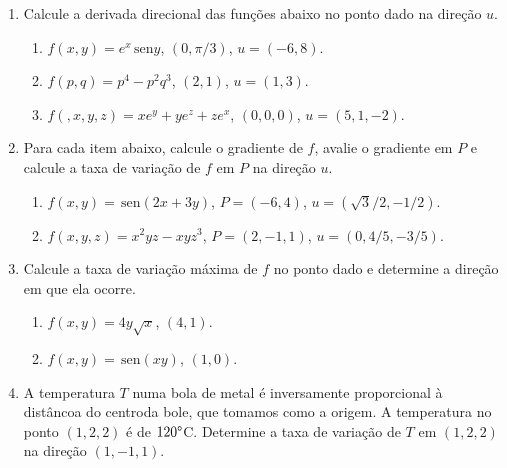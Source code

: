 \documentclass[a4paper,5pt]{amsbook}
\newcommand{\sen}{\,\mbox{sen}}
\begin{document}
\vspace{1cm}
\begin{enumerate}
    \setlength\itemsep{0.5cm}
    \item Calcule a derivada direcional das fun\c{c}\~oes abaixo no ponto dado na dire\c{c}\~ao $u$.
        \begin{enumerate}
            \setlength\itemsep{0.2cm}
            \item $f(x,y) = e^x\sen{y}$, $(0,\pi/3)$, $u=(-6,8)$.
            \item $f(p,q) = p^4-p^2q^3$, $(2,1)$, $u=(1,3)$.
            \item $f(,x,y,z) = xe^y+ye^z+ze^x$, $(0,0,0)$, $u=(5,1,-2)$.
        \end{enumerate}

    \item Para cada item abaixo, calcule o gradiente de $f$, avalie o gradiente
    em $P$ e calcule a taxa de varia\c{c}\~ao de $f$ em $P$ na dire\c{c}\~ao $u$.
        \begin{enumerate}
            \setlength\itemsep{0.2cm}
            \item $f(x,y) = \sen{(2x+3y)}$, $P=(-6,4)$, $u=(\sqrt{3}/2, -1/2)$.
            \item $f(x,y,z) = x^2yz-xyz^3$, $P=(2,-1,1)$, $u=(0,4/5, -3/5)$.
        \end{enumerate}

    \item Calcule a taxa de varia\c{c}\~ao m\'axima de $f$ no ponto dado e determine a
    dire\c{c}\~ao em que ela ocorre.
        \begin{enumerate}
            \setlength\itemsep{0.2cm}
            \item $f(x,y) = 4y\sqrt{x}$, $(4,1)$.
            \item $f(x,y) = \sen{(xy)}$, $(1,0)$.
        \end{enumerate}

    \item A temperatura $T$ numa bola de metal \'e inversamente proporcional \`a
    dist\^ancoa do centroda bole, que tomamos como a origem. A temperatura no
    ponto $(1,2,2)$ \'e de $120\degree$C. Determine a taxa de varia\c{c}\~ao de $T$ em
    $(1,2,2)$ na dire\c{c}\~ao $(1,-1,1)$.
\end{enumerate}
\end{document}
